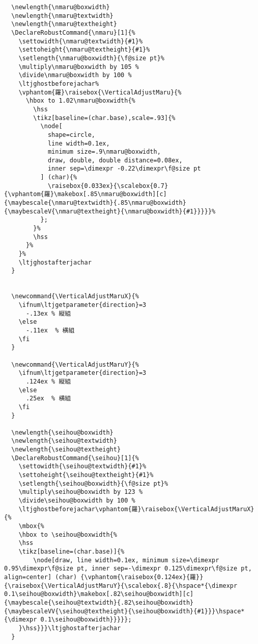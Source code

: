 \documentclass[luatex,fontsize=10pt,paper=b5,twoside]{jlreq}%
\begin{document}
\begin{lstlisting}
  \newlength{\nmaru@boxwidth}
  \newlength{\nmaru@textwidth}
  \newlength{\nmaru@textheight}
  \DeclareRobustCommand{\nmaru}[1]{%
    \settowidth{\nmaru@textwidth}{#1}%
    \settoheight{\nmaru@textheight}{#1}%
    \setlength{\nmaru@boxwidth}{\f@size pt}%
    \multiply\nmaru@boxwidth by 105 %
    \divide\nmaru@boxwidth by 100 %
    \ltjghostbeforejachar%
    \vphantom{羅}\raisebox{\VerticalAdjustMaru}{%
      \hbox to 1.02\nmaru@boxwidth{%
        \hss
        \tikz[baseline=(char.base),scale=.93]{%
          \node[
            shape=circle,
            line width=0.1ex,  
            minimum size=.9\nmaru@boxwidth,  
            draw, double, double distance=0.08ex,
            inner sep=\dimexpr -0.22\dimexpr\f@size pt    
          ] (char){%
            \raisebox{0.033ex}{\scalebox{0.7}{\vphantom{羅}\makebox[.85\nmaru@boxwidth][c]{\maybescale{\nmaru@textwidth}{.85\nmaru@boxwidth}{\maybescaleV{\nmaru@textheight}{\nmaru@boxwidth}{#1}}}}}%
          };
        }%
        \hss
      }%
    }%
    \ltjghostafterjachar
  }


  \newcommand{\VerticalAdjustMaruX}{%
    \ifnum\ltjgetparameter{direction}=3
      -.13ex % 縦組
    \else
      -.11ex  % 横組
    \fi
  }

  \newcommand{\VerticalAdjustMaruY}{%
    \ifnum\ltjgetparameter{direction}=3
      .124ex % 縦組
    \else
      .25ex  % 横組
    \fi
  }

  \newlength{\seihou@boxwidth}
  \newlength{\seihou@textwidth}
  \newlength{\seihou@textheight}
  \DeclareRobustCommand{\seihou}[1]{%
    \settowidth{\seihou@textwidth}{#1}%
    \settoheight{\seihou@textheight}{#1}%
    \setlength{\seihou@boxwidth}{\f@size pt}%
    \multiply\seihou@boxwidth by 123 %
    \divide\seihou@boxwidth by 100 %
    \ltjghostbeforejachar\vphantom{羅}\raisebox{\VerticalAdjustMaruX}{%
    \mbox{%
    \hbox to \seihou@boxwidth{%
    \hss
    \tikz[baseline=(char.base)]{%
        \node[draw, line width=0.1ex, minimum size=\dimexpr 0.95\dimexpr\f@size pt, inner sep=-\dimexpr 0.125\dimexpr\f@size pt, align=center] (char) {\vphantom{\raisebox{0.124ex}{羅}}{\raisebox{\VerticalAdjustMaruY}{\scalebox{.8}{\hspace*{\dimexpr 0.1\seihou@boxwidth}\makebox[.82\seihou@boxwidth][c]{\maybescale{\seihou@textwidth}{.82\seihou@boxwidth}{\maybescaleVV{\seihou@textheight}{\seihou@boxwidth}{#1}}}\hspace*{\dimexpr 0.1\seihou@boxwidth}}}}};
    }\hss}}}\ltjghostafterjachar
  }


\end{lstlisting}
\end{document}
